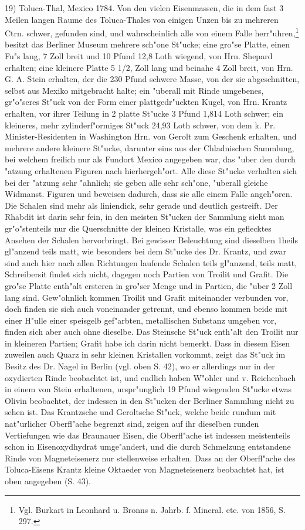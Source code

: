 \documentclass[a4paper, 11pt, oneside]{article}
\begin{document}
19) Toluca-Thal, Mexico 1784. Von den vielen Eisenmassen, die in dem fast 3 Meilen langen Raume des Toluca-Thales von einigen Unzen bis zu mehreren Ctrn. schwer, gefunden sind, und wahrscheinlich alle von einem Falle herr"uhren,\footnote{Vgl. Burkart in Leonhard u. Bronns n. Jahrb. f. Mineral. etc. von 1856, S. 297.} besitzt das Berliner Museum mehrere sch"one St"ucke; eine gro"se Platte, einen Fu"s lang, 7 Zoll breit und 10 Pfund 12,8 Loth wiegend, von Hrn. Shepard erhalten; eine kleinere Platte 5 1/2, Zoll lang und beinahe 4 Zoll breit, von Hrn. G. A. Stein erhalten, der die 230 Pfund schwere Masse, von der sie abgeschnitten, selbst aus Mexiko mitgebracht halte; ein "uberall mit Rinde umgebenes, gr"o"seres St"uck von der Form einer plattgedr"uckten Kugel, von Hrn. Krantz erhalten, vor ihrer Teilung in 2 platte St"ucke 3 Pfund 1,814 Loth schwer; ein kleineres, mehr zylinderf"ormiges St"uck 24,93 Loth schwer, von dem k. Pr. Minister-Residenten in Washington Hrn. von Gerolt zum Geschenk erhalten, und mehrere andere kleinere St"ucke, darunter eins aus der Chladnischen Sammlung, bei welchem freilich nur als Fundort Mexico angegeben war, das "uber den durch "atzung erhaltenen Figuren nach hierhergeh"ort. Alle diese St"ucke verhalten sich bei der "atzung sehr "ahnlich; sie geben alle sehr sch"one, "uberall gleiche Widmanst. Figuren und beweisen dadurch, dass sie alle einem Falle angeh"oren. Die Schalen sind mehr als liniendick, sehr gerade und deutlich gestreift. Der Rhabdit ist darin sehr fein, in den meisten St"ucken der Sammlung sieht man gr"o"stenteils nur die Querschnitte der kleinen Kristalle, was ein geflecktes Ansehen der Schalen hervorbringt. Bei gewisser Beleuchtung sind dieselben 1heils gl"anzend teils matt, wie besonders bei dem St"ucke des Dr. Krantz, und zwar sind auch hier nach allen Richtungen laufende Schalen teils gl"anzend, teils matt, Schreibersit findet sich nicht, dagegen noch Partien von Troilit und Grafit. Die gro"se Platte enth"alt ersteren in gro"ser Menge und in Partien, die "uber 2 Zoll lang sind. Gew"ohnlich kommen Troilit und Grafit miteinander verbunden vor, doch finden sie sich auch voneinander getrennt, und ebenso kommen beide mit einer H"ulle einer speisgelb gef"arbten, metallischen Substanz umgeben vor, finden sich aber auch ohne dieselbe. Das Steinsche St"uck enth"alt den Troilit nur in kleineren Partien; Grafit habe ich darin nicht bemerkt. Dass in diesem Eisen zuweilen auch Quarz in sehr kleinen Kristallen vorkommt, zeigt das St"uck im Besitz des Dr. Nagel in Berlin (vgl. oben S. 42), wo er allerdings nur in der oxydierten Rinde beobachtet ist, und endlich haben W"ohler und v. Reichenbach in einem von Stein erhaltenen, urspr"unglich 19 Pfund wiegenden St"ucke etwas Olivin beobachtet, der indessen in den St"ucken der Berliner Sammlung nicht zu sehen ist. Das Krantzsche und Geroltsche St"uck, welche beide rundum mit nat"urlicher Oberfl"ache begrenzt sind, zeigen auf ihr dieselben runden Vertiefungen wie das Braunauer Eisen, die Oberfl"ache ist indessen meistenteils schon in Eisenoxydhydrat umge"andert, und die durch Schmelzung entstandene Rinde von Magneteisenerz nur stellenweise erhalten. Dass an der Oberfl"ache des Toluca-Eisens Krantz kleine Oktaeder von Magneteisenerz beobachtet hat, ist oben angegeben (S. 43).
\end{document}
